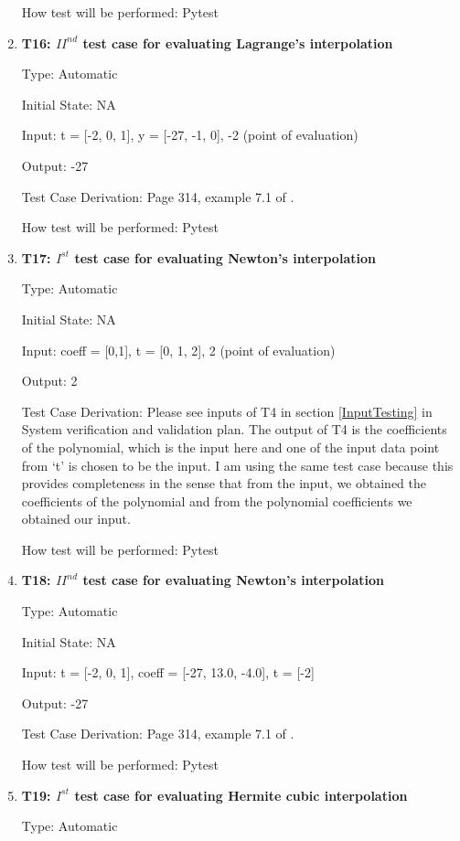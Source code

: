 \documentclass[12pt, titlepage]{article}
\begin{document}
\begin{enumerate}
How test will be performed: Pytest

\item{\textbf{T16: ${II}^{nd}$ test case for evaluating Lagrange's 
interpolation}}

Type: Automatic

Initial State: NA 

Input: t = [-2, 0, 1], y = [-27, -1, 0], -2 (point of evaluation)

Output: -27

Test Case Derivation: Page 314, example 7.1 of \cite{Health1997}. 

How test will be performed: Pytest


\item{\textbf{T17: $I^{st}$ test case for evaluating Newton's interpolation}}

Type: Automatic

Initial State: NA 

Input: coeff = [0,1], t = [0, 1, 2],  2 (point of evaluation)

Output: 2

Test Case Derivation: Please see inputs of T4 in section \ref{InputTesting} in 
System verification and validation plan. The output of T4 is the coefficients 
of the polynomial, which is the input here and one of the input data point from 
`t' is chosen to be the input. I am using the same test case because this 
provides completeness in the sense that from the input, we obtained the 
coefficients of the polynomial and from the polynomial coefficients we obtained 
our input. 

How test will be performed: Pytest

\item{\textbf{T18: ${II}^{nd}$ test case for evaluating Newton's interpolation}}

Type: Automatic

Initial State: NA 

Input: t = [-2, 0, 1], coeff = [-27, 13.0, -4.0], t = [-2] 

Output: -27

Test Case Derivation: Page 314, example 7.1 of \cite{Health1997}. 

How test will be performed: Pytest



\item{\textbf{T19: $I^{st}$ test case for evaluating Hermite cubic 
interpolation}}

Type: Automatic


\end{enumerate}
\end{document}
